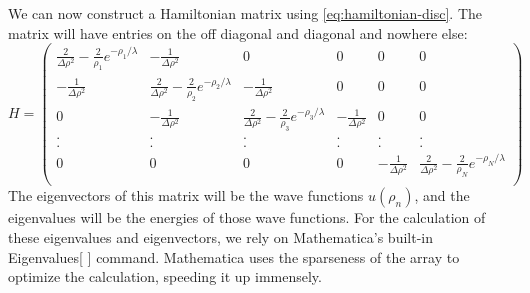 \documentclass[12pt,twoside]{reedthesis}
\begin{document}
We can now construct a Hamiltonian matrix using \eqref{eq:hamiltonian-disc}. The matrix will have entries on the off diagonal and diagonal and nowhere else:
\begin{equation*}H = \left(
\begin{array}{cccccc}
\frac{2} {\Delta \rho^2} -  \frac{2}{\rho_1}e^{-\rho_1/\lambda} & -\frac{1}{\Delta \rho^2} &  0 & 0 & 0 & 0 \\
-\frac{1}{\Delta \rho^2} & \frac{2} {\Delta \rho^2} -  \frac{2}{\rho_2}e^{-\rho_2/\lambda} &  -\frac{1}{\Delta \rho^2}  & 0 & 0 & 0 \\
0 &  -\frac{1}{\Delta \rho^2} & \frac{2} {\Delta \rho^2} -  \frac{2}{\rho_3}e^{-\rho_3/\lambda} &  -\frac{1}{\Delta \rho^2}  & 0 & 0 \\
 .&  . &.  &. & .& .  \\
 .& . & . & .& .&  . \\
0 & 0 &  0 & 0&  -\frac{1}{\Delta \rho^2} & \frac{2} {\Delta \rho^2} -  \frac{2}{\rho_N}e^{-\rho_N/\lambda}   \\
\end{array}
\right)
\end{equation*}
The eigenvectors of this matrix will be the wave functions $u(\rho_n)$, and the eigenvalues will be the energies of those wave functions. For the calculation of these eigenvalues and eigenvectors, we rely on Mathematica's built-in Eigenvalues[ ] command. Mathematica uses the sparseness of the array to optimize the calculation, speeding it up immensely. 
\end{document}
